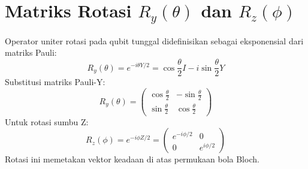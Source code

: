 \section{Matriks Rotasi $R_y(\theta)$ dan $R_z(\phi)$}
Operator uniter rotasi pada qubit tunggal didefinisikan sebagai eksponensial dari matriks Pauli:
\begin{equation}
R_y(\theta) = e^{-i \theta Y / 2} = \cos\frac{\theta}{2} I - i \sin\frac{\theta}{2} Y
\end{equation}
Substitusi matriks Pauli-Y:
\begin{equation}
R_y(\theta) = \begin{pmatrix} \cos\frac{\theta}{2} & -\sin\frac{\theta}{2} \\ \sin\frac{\theta}{2} & \cos\frac{\theta}{2} \end{pmatrix}
\end{equation}
Untuk rotasi sumbu Z:
\begin{equation}
R_z(\phi) = e^{-i \phi Z / 2} = \begin{pmatrix} e^{-i\phi/2} & 0 \\ 0 & e^{i\phi/2} \end{pmatrix}
\end{equation}
Rotasi ini memetakan vektor keadaan di atas permukaan bola Bloch.
